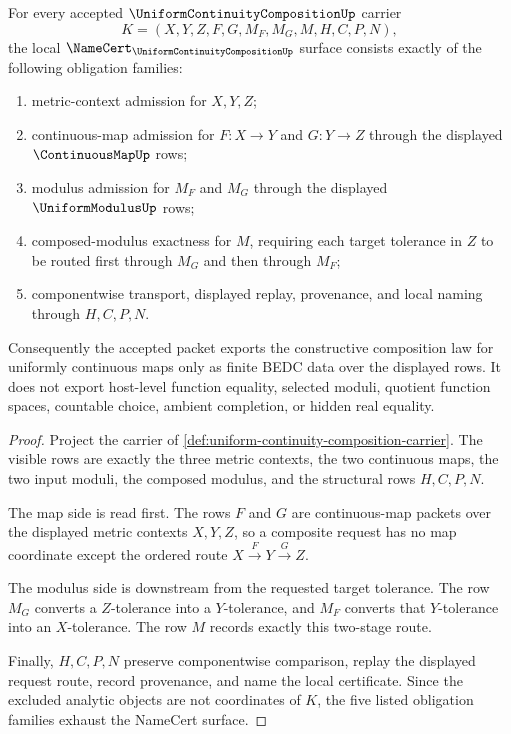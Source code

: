 \begin{theorem}
\label{thm:uniform-continuity-composition-namecert-obligations}
For every accepted $\UniformContinuityCompositionUp$ carrier
$$
K=(X,Y,Z,F,G,M_F,M_G,M,H,C,P,N),
$$
the local $\NameCert_{\UniformContinuityCompositionUp}$ surface consists exactly of the following obligation families:
\begin{enumerate}
\item metric-context admission for $X,Y,Z$;
\item continuous-map admission for $F:X\to Y$ and $G:Y\to Z$ through the displayed $\ContinuousMapUp$ rows;
\item modulus admission for $M_F$ and $M_G$ through the displayed $\UniformModulusUp$ rows;
\item composed-modulus exactness for $M$, requiring each target tolerance in $Z$ to be routed first through $M_G$ and then through $M_F$;
\item componentwise transport, displayed replay, provenance, and local naming through $H,C,P,N$.
\end{enumerate}
Consequently the accepted packet exports the constructive composition law for uniformly continuous maps only as finite BEDC data over the displayed rows. It does not export host-level function equality, selected moduli, quotient function spaces, countable choice, ambient completion, or hidden real equality.
\end{theorem}
\begin{proof}
Project the carrier of \autoref{def:uniform-continuity-composition-carrier}. The visible rows are exactly the three metric contexts, the two continuous maps, the two input moduli, the composed modulus, and the structural rows $H,C,P,N$.

The map side is read first. The rows $F$ and $G$ are continuous-map packets over the displayed metric contexts $X,Y,Z$, so a composite request has no map coordinate except the ordered route $X \xrightarrow{F} Y \xrightarrow{G} Z$.

The modulus side is downstream from the requested target tolerance. The row $M_G$ converts a $Z$-tolerance into a $Y$-tolerance, and $M_F$ converts that $Y$-tolerance into an $X$-tolerance. The row $M$ records exactly this two-stage route.

Finally, $H,C,P,N$ preserve componentwise comparison, replay the displayed request route, record provenance, and name the local certificate. Since the excluded analytic objects are not coordinates of $K$, the five listed obligation families exhaust the NameCert surface.
\end{proof}

